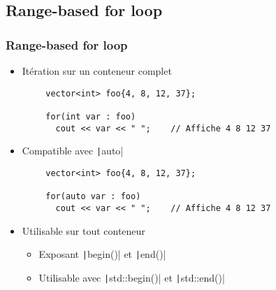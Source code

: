 \documentclass[C++.tex]{subfiles}
\begin{document}
\subsection*{Range-based for loop}
\begin{frame}[fragile]
	\frametitle{Range-based for loop}
	\begin{itemize}
		\item Itération sur un conteneur complet
	\end{itemize}

	\begin{verbatim}
		vector<int> foo{4, 8, 12, 37};

		for(int var : foo)
		  cout << var << " ";    // Affiche 4 8 12 37
	\end{verbatim}

	\begin{itemize}
		\item Compatible avec \texttt|auto|
	\end{itemize}

	\begin{verbatim}
		vector<int> foo{4, 8, 12, 37};

		for(auto var : foo)
		  cout << var << " ";    // Affiche 4 8 12 37
	\end{verbatim}

	\begin{itemize}
		\item Utilisable sur tout conteneur
		\begin{itemize}
			\item Exposant \texttt|begin()| et \texttt|end()|
			\item Utilisable avec \texttt|std::begin()| et \texttt|std::end()|
		\end{itemize}
	\end{itemize}

\end{frame}
\end{document}
